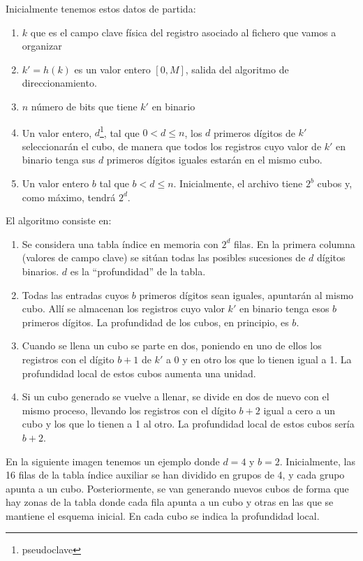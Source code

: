 \documentclass[10pt,a4paper,spanish]{report}
\begin{document}
    Inicialmente tenemos estos datos de partida:
    \begin{enumerate}[$\heartsuit$]
        \item $k$ que es el campo clave física del registro asociado al fichero que vamos a organizar
        \item $k' = h(k)$ es un valor entero $[0,M]$, salida del algoritmo de direccionamiento.
        \item $n$ número de bits que tiene $k'$ en binario
        \item Un valor entero, $d$\footnote{pseudoclave}, tal que $0 < d \leq n$, los $d$ primeros dígitos de $k'$ seleccionarán el cubo, de manera que todos los registros cuyo valor de $k'$ en binario tenga sus $d$ primeros dígitos iguales estarán en el mismo cubo.
        \item Un valor entero $b$ tal que $b < d \leq n$. Inicialmente, el archivo tiene $2^b$ cubos y, como máximo, tendrá $2^d$.
    \end{enumerate}

    El algoritmo consiste en:
    \begin{enumerate}
        \item Se considera una tabla índice en memoria con $2^d$ filas. En la primera columna (valores de campo clave) se sitúan todas las posibles sucesiones de $d$ dígitos binarios. $d$ es la ``profundidad'' de la tabla.
        \item Todas las entradas cuyos $b$ primeros dígitos sean iguales, apuntarán al mismo cubo. Allí se almacenan los registros cuyo valor $k'$ en binario tenga esos $b$ primeros dígitos. La profundidad de los cubos, en principio, es $b$.
        \item Cuando se llena un cubo se parte en dos, poniendo en uno de ellos los registros con el dígito $b+1$ de $k'$ a 0 y en otro los que lo tienen igual a 1. La profundidad local de estos cubos aumenta una unidad.
        \item Si un cubo generado se vuelve a llenar, se divide en dos de nuevo con el mismo proceso, llevando los registros con el dígito $b+2$ igual a cero a un cubo y los que lo tienen a 1 al otro. La profundidad local de estos cubos sería $b+2$.
    \end{enumerate}

En la siguiente imagen tenemos un ejemplo donde $d = 4$ y $b=2$. Inicialmente, las 16 filas de la tabla índice auxiliar se han dividido en grupos de 4, y cada grupo apunta a un cubo. Posteriormente, se van generando nuevos cubos de forma que hay zonas  de la tabla donde cada fila apunta a un cubo y otras en las que se mantiene el esquema inicial. En cada cubo se indica la profundidad local.
\end{document}
